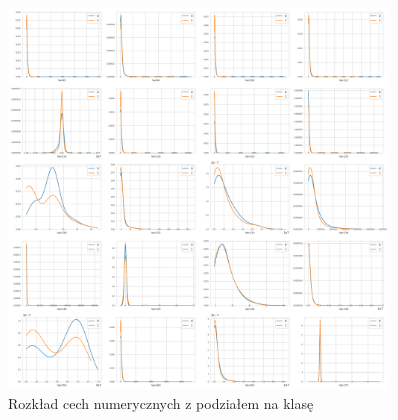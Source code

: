 \documentclass[a4paper,12pt]{article}
\begin{document}
\begin{appendices}
        \newpage

        \begin{figure}[!h]
            \centering
            \includegraphics[width=0.9\textwidth]{../images/feature-distribution-20-40.png}
            \caption{Rozkład cech numerycznych z podziałem na klasę}
        \end{figure}

    \end{appendices}
\end{document}

